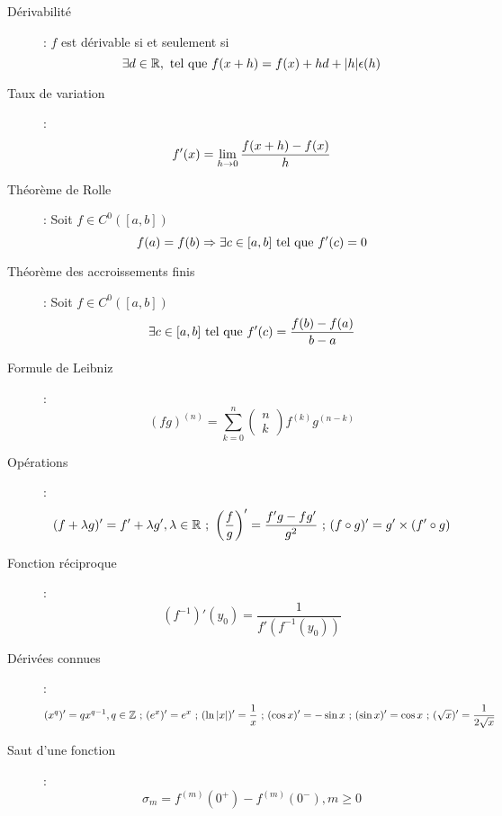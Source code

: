 \begin{description}
\item[Dérivabilité] : $f$ est dérivable si et seulement si
    \[ \exists d\in\mathbb{R},\textrm{ tel que } f(x+h)=f(x)+hd+|h|\epsilon(h) \]
\item[Taux de variation] : 
    \[ f'(x)=\lim_{h\rightarrow0}\frac{f(x+h)-f(x)}{h} \]
\item[Théorème de Rolle] : Soit $f\in C^0([a,b])$
    \[ f(a)=f(b)\Rightarrow\exists c\in[a,b]\textrm{ tel que } f'(c)=0 \]
\item[Théorème des accroissements finis] : Soit $f\in C^0([a,b])$
    \[ \exists c\in[a,b]\textrm{ tel que } f'(c)=\frac{f(b)-f(a)}{b-a} \]
\item[Formule de Leibniz] : 
    \[
        (fg)^{(n)}=\sum_{k=0}^n
        \begin{pmatrix}
            n\\
            k
        \end{pmatrix}
        f^{(k)}g^{(n-k)}
    \]
\item[Opérations] : 
    \[
        (f+\lambda g)'=f'+\lambda g', \lambda\in\mathbb{R}
        \textrm{ ; }
        \left(\frac{f}{g}\right)'=\frac{f'g-fg'}{g^2}
        \textrm{ ; }
        (f\circ g)'=g'\times(f'\circ g)
    \]
\item[Fonction réciproque] : 
    \[
        \left(f^{-1}\right)'(y_0)=\frac{1}{f'(f^{-1}(y_0))}
    \]
\item[Dérivées connues] : 
    \[
        (x^q)'=qx^{q-1}, q\in\mathbb{Z}
        \textrm{ ; }
        (e^x)'=e^x
        \textrm{ ; }
        (\ln|x|)'=\frac{1}{x}
        \textrm{ ; }
        (\cos x)'=-\sin x
        \textrm{ ; }
        (\sin x)'=\cos x
        \textrm{ ; }
        (\sqrt x)'=\frac{1}{2\sqrt x}
    \]
\item[Saut d'une fonction] : 
    \[
        \sigma_m=f^{(m)}(0^+)-f^{(m)}(0^-), m\ge 0
    \]
\end{description}